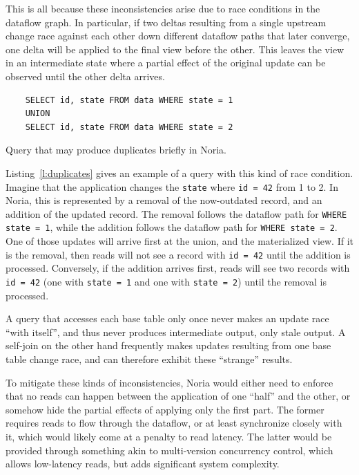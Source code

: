 This is all because these inconsistencies arise due to race conditions in the
dataflow graph. In particular, if two deltas resulting from a single upstream
change race against each other down different dataflow paths that later
converge, one delta will be applied to the final view before the other. This
leaves the view in an intermediate state where a partial effect of the original
update can be observed until the other delta arrives.

\begin{listing}[h]
  \begin{verbatim}
    SELECT id, state FROM data WHERE state = 1
    UNION
    SELECT id, state FROM data WHERE state = 2
  \end{verbatim}
  \caption{Query that may produce duplicates briefly in Noria.}
  \label{l:duplicates}
\end{listing}

Listing~\vref{l:duplicates} gives an example of a query with this kind of race
condition. Imagine that the application changes the \texttt{state} where
\texttt{id = 42} from 1 to 2. In Noria, this is represented by a removal of the
now-outdated record, and an addition of the updated record. The removal follows
the dataflow path for \texttt{WHERE state = 1}, while the addition follows the
dataflow path for \texttt{WHERE state = 2}. One of those updates will arrive
first at the union, and the materialized view. If it is the removal, then reads
will not see a record with \texttt{id = 42} until the addition is processed.
Conversely, if the addition arrives first, reads will see two records with
\texttt{id = 42} (one with \texttt{state = 1} and one with \texttt{state = 2})
until the removal is processed.

A query that accesses each base table only once never makes an update race
``with itself'', and thus never produces intermediate output, only stale output.
A self-join on the other hand frequently makes updates resulting from one base
table change race, and can therefore exhibit these ``strange'' results.

To mitigate these kinds of inconsistencies, Noria would either need to enforce
that no reads can happen between the application of one ``half'' and the other,
or somehow hide the partial effects of applying only the first part. The former
requires reads to flow through the dataflow, or at least synchronize closely
with it, which would likely come at a penalty to read latency. The latter would
be provided through something akin to multi-version concurrency control, which
allows low-latency reads, but adds significant system complexity.

